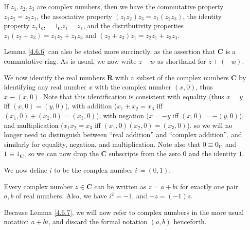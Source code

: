 \begin{lemma}\label{4.6.6}
    If \(z_1, z_2, z_3\) are complex numbers, then we have the commutative property \(z_1 z_2 = z_2 z_1\), the associative property \((z_1 z_2) z_3 = z_1 (z_2 z_3)\), the identity property \(z_1 1_{\mathbf{C}} = 1_{\mathbf{C}} z_1 = z_1\), and the distributivity properties \(z_1 (z_2 + z_3) = z_1 z_2 + z_1 z_3\) and \((z_2 + z_3) z_1 = z_2 z_1 + z_3 z_1\).
\end{lemma}

\begin{note}
    Lemma \ref{4.6.6} can also be stated more succinctly, as the assertion that \(\mathbf{C}\) is a commutative ring.
    As is usual, we now write \(z - w\) as shorthand for \(z + (-w)\).
\end{note}

\begin{note}
    We now identify the real numbers \(\mathbf{R}\) with a subset of the complex numbers \(\mathbf{C}\) by identifying any real number \(x\) with the complex number \((x, 0)\), thus \(x \equiv (x, 0)\).
    Note that this identification is consistent with equality (thus \(x = y\) iff \((x, 0) = (y, 0)\)), with addition (\(x_1 + x_2 = x_3\) iff \((x_1, 0) + (x_2, 0) = (x_3, 0)\)), with negation (\(x = -y\) iff \((x, 0) = -(y, 0)\)), and multiplication (\(x_1 x_2 = x_3\) iff \((x_1, 0) (x_2, 0) = (x_3, 0)\)), so we will no longer need to distinguish between ``real addition'' and ``complex addition'', and similarly for equality, negation, and multiplication.
    Note also that \(0 \equiv 0_\mathbf{C}\) and \(1 \equiv 1_\mathbf{C}\), so we can now drop the \(\mathbf{C}\) subscripts from the zero \(0\) and the identity \(1\).
\end{note}

\begin{note}
    We now define \(i\) to be the complex number \(i \coloneqq (0, 1)\).
\end{note}

\begin{lemma}\label{4.6.7}
    Every complex number \(z \in \mathbf{C}\) can be written as \(z = a + bi\) for exactly one pair \(a, b\) of real numbers.
    Also, we have \(i^2 = -1\), and \(-z = (-1)z\).
\end{lemma}

\begin{note}
    Because Lemma \ref{4.6.7}, we will now refer to complex numbers in the more usual notation \(a + bi\), and discard the formal notation \((a, b)\) henceforth.
\end{note}


